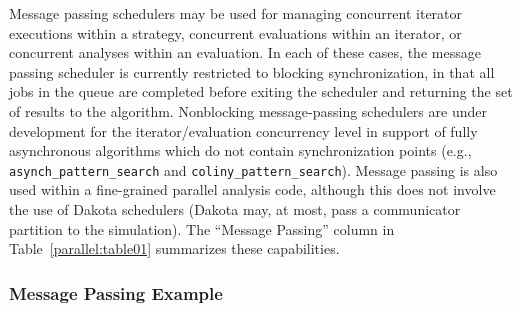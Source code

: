 
Message passing schedulers may be used for managing concurrent
iterator executions within a strategy, concurrent evaluations within
an iterator, or concurrent analyses within an evaluation.  In each of
these cases, the message passing scheduler is currently restricted to
blocking synchronization, in that all jobs in the queue are completed
before exiting the scheduler and returning the set of results to the
algorithm. Nonblocking message-passing schedulers are under
development for the iterator/evaluation concurrency level in support
of fully asynchronous algorithms which do not contain synchronization
points (e.g., \texttt{asynch\_pattern\_search} and
\texttt{coliny\_pattern\_search}).  Message passing is also used within
a fine-grained parallel analysis code, although this does not involve
the use of Dakota schedulers (Dakota may, at most, pass a communicator
partition to the simulation).  The ``Message Passing'' column in
Table~\ref{parallel:table01} summarizes these capabilities.

\subsubsection{Message Passing Example}\label{parallel:SLP:message:ex}

